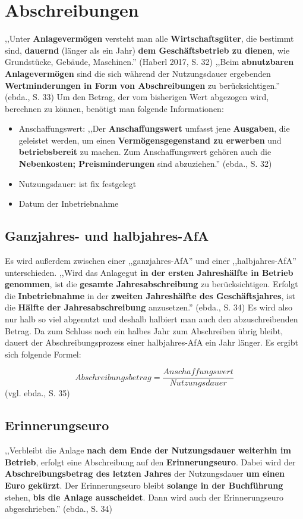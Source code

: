 \documentclass[12pt]{report}
\begin{document}
\section{Abschreibungen}
,,Unter \textbf{Anlagevermögen} versteht man alle \textbf{Wirtschaftsgüter}, die bestimmt sind, \textbf{dauernd} (länger als ein Jahr) \textbf{dem Geschäftsbetrieb zu dienen}, wie Grundstücke, Gebäude, Maschinen.'' (Haberl 2017, S. 32\nocite{RW4}) ,,Beim \textbf{abnutzbaren Anlagevermögen} sind die sich während der Nutzungsdauer ergebenden \textbf{Wertminderungen in Form von Abschreibungen} zu berücksichtigen.'' (ebda., S. 33\nocite{RW4}) Um den Betrag, der vom bisherigen Wert abgezogen wird, berechnen zu können, benötigt man folgende Informationen:
\begin{itemize}
	\item Anschaffungswert: ,,Der \textbf{Anschaffungswert} umfasst jene \textbf{Ausgaben}, die geleistet werden, um einen \textbf{Vermögensgegenstand zu erwerben} und \textbf{betriebsbereit} zu machen. Zum Anschaffungswert gehören auch die \textbf{Nebenkosten; Preisminderungen} sind abzuziehen.'' (ebda., S. 32\nocite{RW4})
	\item Nutzungsdauer: ist fix festgelegt
	\item Datum der Inbetriebnahme
\end{itemize}

\subsection{Ganzjahres- und halbjahres-AfA}
Es wird außerdem zwischen einer ,,ganzjahres-AfA'' und einer ,,halbjahres-AfA'' unterschieden. ,,Wird das Anlagegut \textbf{in der ersten Jahreshälfte in Betrieb genommen}, ist die \textbf{gesamte Jahresabschreibung} zu berücksichtigen. Erfolgt die \textbf{Inbetriebnahme} in der \textbf{zweiten Jahreshälfte des Geschäftsjahres}, ist die \textbf{Hälfte der Jahresabschreibung} anzusetzen.'' (ebda., S. 34\nocite{RW4})
Es wird also nur halb so viel abgenutzt und deshalb halbiert man auch den abzuschreibenden Betrag. Da zum Schluss noch ein halbes Jahr zum Abschreiben übrig bleibt, dauert der Abschreibungsprozess einer halbjahres-AfA ein Jahr länger. Es ergibt sich folgende Formel:


\begin{equation}
	Abschreibungsbetrag = \frac{Anschaffungswert}{Nutzungsdauer}
\end{equation} (vgl. ebda., S. 35\nocite{RW4})

\subsection{Erinnerungseuro}
,,Verbleibt die Anlage \textbf{nach dem Ende der Nutzungsdauer weiterhin im Betrieb}, erfolgt eine Abschreibung auf den \textbf{Erinnerungseuro}. Dabei wird der \textbf{Abschreibungsbetrag des letzten Jahres} der Nutzungsdauer \textbf{um einen Euro gekürzt}. Der Erinnerungseuro bleibt \textbf{solange in der Buchführung} stehen, \textbf{bis die Anlage ausscheidet}. Dann wird auch der Erinnerungseuro abgeschrieben.'' (ebda., S. 34\nocite{RW4})
\end{document}
